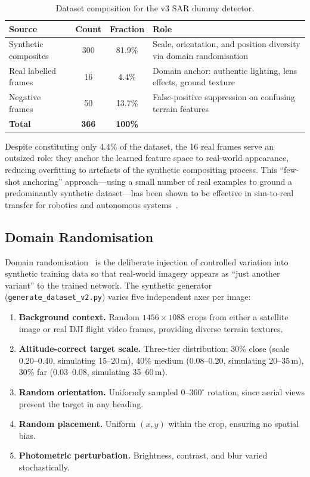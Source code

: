 \documentclass[10pt,a4paper]{article}
\begin{document}
\begin{table}[ht]
  \centering
  \caption{Dataset composition for the v3 SAR dummy detector.}\label{tab:data-composition}
  \begin{tabular}{@{}lccp{5.5cm}@{}}
    \toprule
    \textbf{Source} & \textbf{Count} & \textbf{Fraction} & \textbf{Role} \\
    \midrule
    Synthetic composites & 300 & 81.9\% & Scale, orientation, and position diversity via domain randomisation \\
    Real labelled frames & 16 & 4.4\% & Domain anchor: authentic lighting, lens effects, ground texture \\
    Negative frames & 50 & 13.7\% & False-positive suppression on confusing terrain features \\
    \midrule
    \textbf{Total} & \textbf{366} & \textbf{100\%} & \\
    \bottomrule
  \end{tabular}
\end{table}

Despite constituting only 4.4\% of the dataset, the 16 real frames serve an outsized role: they anchor the learned feature space to real-world appearance, reducing overfitting to artefacts of the synthetic compositing process. This ``few-shot anchoring'' approach---using a small number of real examples to ground a predominantly synthetic dataset---has been shown to be effective in sim-to-real transfer for robotics and autonomous systems~\cite{domainrand}.

\subsection{Domain Randomisation}\label{sec:training:domainrand}

Domain randomisation~\cite{domainrand} is the deliberate injection of controlled variation into synthetic training data so that real-world imagery appears as ``just another variant'' to the trained network. The synthetic generator (\texttt{generate\_dataset\_v2.py}) varies five independent axes per image:

\begin{enumerate}
    \item \textbf{Background context.} Random $1456 \times 1088$ crops from either a satellite image or real DJI flight video frames, providing diverse terrain textures.
    \item \textbf{Altitude-correct target scale.} Three-tier distribution: 30\% close (scale 0.20--0.40, simulating 15--20\,m), 40\% medium (0.08--0.20, simulating 20--35\,m), 30\% far (0.03--0.08, simulating 35--60\,m).
    \item \textbf{Random orientation.} Uniformly sampled $0$--$360^{\circ}$ rotation, since aerial views present the target in any heading.
    \item \textbf{Random placement.} Uniform $(x, y)$ within the crop, ensuring no spatial bias.
    \item \textbf{Photometric perturbation.} Brightness, contrast, and blur varied stochastically.
\end{enumerate}
\end{document}
